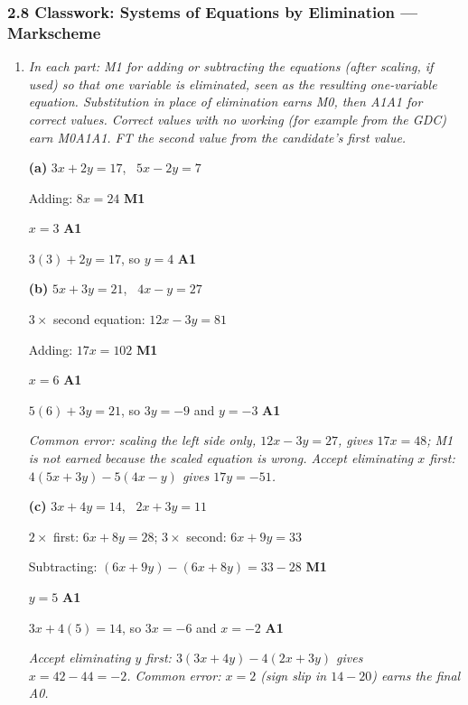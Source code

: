 \documentclass[12pt, twoside]{article}
\begin{document}
\subsubsection*{2.8 Classwork: Systems of Equations by Elimination --- Markscheme}

\begin{enumerate}[itemsep=0.3cm]

\item[1.] [Maximum mark: 9]

\emph{In each part: M1 for adding or subtracting the equations (after
scaling, if used) so that one variable is eliminated, seen as the
resulting one-variable equation. Substitution in place of elimination
earns M0, then A1A1 for correct values. Correct values with no working
(for example from the GDC) earn M0A1A1. FT the second value from the
candidate's first value.}

\textbf{(a)} $3x + 2y = 17$, \ $5x - 2y = 7$

Adding: $8x = 24$ \hfill \textbf{M1}

$x = 3$ \hfill \textbf{A1}

$3(3) + 2y = 17$, so $y = 4$ \hfill \textbf{A1}

\textbf{(b)} $5x + 3y = 21$, \ $4x - y = 27$

$3 \times$ second equation: $12x - 3y = 81$

Adding: $17x = 102$ \hfill \textbf{M1}

$x = 6$ \hfill \textbf{A1}

$5(6) + 3y = 21$, so $3y = -9$ and $y = -3$ \hfill \textbf{A1}

\emph{Common error: scaling the left side only, $12x - 3y = 27$, gives
$17x = 48$; M1 is not earned because the scaled equation is wrong.
Accept eliminating $x$ first: $4(5x + 3y) - 5(4x - y)$ gives
$17y = -51$.}

\textbf{(c)} $3x + 4y = 14$, \ $2x + 3y = 11$

$2 \times$ first: $6x + 8y = 28$; \quad $3 \times$ second: $6x + 9y = 33$

Subtracting: $(6x + 9y) - (6x + 8y) = 33 - 28$ \hfill \textbf{M1}

$y = 5$ \hfill \textbf{A1}

$3x + 4(5) = 14$, so $3x = -6$ and $x = -2$ \hfill \textbf{A1}

\emph{Accept eliminating $y$ first: $3(3x + 4y) - 4(2x + 3y)$ gives
$x = 42 - 44 = -2$. Common error: $x = 2$ (sign slip in $14 - 20$) earns
the final A0.}


\end{enumerate}
\end{document}
